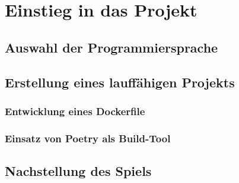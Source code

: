 \chapter{Einstieg in das Projekt}
\label{ch:planung}

\section{Auswahl der Programmiersprache}
\label{sec:auswahl-programmiersprache}


\section{Erstellung eines lauffähigen Projekts}
\label{sec:erstellung-projekt}


\subsection{Entwicklung eines Dockerfile}
\label{subsec:dockerfile}

\subsection{Einsatz von Poetry als Build-Tool}
\label{subsec:poetry}


\section{Nachstellung des Spiels}
\label{sec:nachstellung-spiel}

